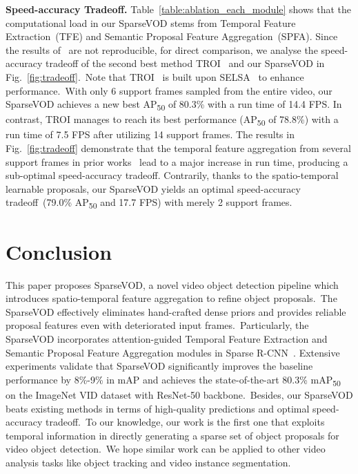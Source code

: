 \documentclass{bmvc2k}
\begin{document}
\noindent \textbf{Speed-accuracy Tradeoff.}
\label{subsec:comp_analysis}
Table~\ref{table:ablation_each_module} shows that the computational load in our SparseVOD stems from Temporal Feature Extraction~(TFE) and Semantic Proposal Feature Aggregation~(SPFA). Since the results of~\cite{he2021end} are not reproducible, for direct comparison, we analyse the speed-accuracy tradeoff of the second best method TROI~\cite{gong2021temporal} and our SparseVOD in Fig.~\ref{fig:tradeoff}.~Note that TROI~\cite{gong2021temporal} is built upon SELSA~\cite{wu2019sequence} to enhance performance.~With only 6 support frames sampled from the entire video, our SparseVOD achieves a new best AP\textsubscript{50} of 80.3\% with a run time of 14.4 FPS. In contrast, TROI manages to reach its best performance (AP\textsubscript{50} of 78.8\%) with a run time of 7.5 FPS after utilizing 14 support frames. The results in Fig.~\ref{fig:tradeoff} demonstrate that the temporal feature aggregation from several support frames in prior works~\cite{wu2019sequence, gong2021temporal} lead to a major increase in run time, producing a sub-optimal speed-accuracy tradeoff. Contrarily, thanks to the spatio-temporal learnable proposals, our SparseVOD yields an optimal speed-accuracy tradeoff~(79.0\% AP\textsubscript{50} and 17.7 FPS) with merely 2 support frames.



\vspace{-15pt}
\section{Conclusion}
\label{sec:conclusion}
\vspace{-5pt}
This paper proposes SparseVOD, a novel video object detection pipeline which introduces spatio-temporal feature aggregation to refine object proposals.~The SparseVOD effectively eliminates hand-crafted dense priors and provides reliable proposal features even with deteriorated input frames.~Particularly, the SparseVOD incorporates attention-guided Temporal Feature Extraction and Semantic Proposal Feature Aggregation modules in Sparse R-CNN~\cite{sun2021sparse}. Extensive experiments validate that SparseVOD significantly improves the baseline performance by 8\%-9\% in mAP and achieves the state-of-the-art 80.3\% mAP\textsubscript{50} on the ImageNet VID dataset with ResNet-50 backbone.~Besides, our SparseVOD beats existing methods in terms of high-quality predictions and optimal speed-accuracy tradeoff.~To our knowledge, our work is the first one that exploits temporal information in directly generating a sparse set of object proposals for video object detection.~We hope similar work can be applied to other video analysis tasks like object tracking and video instance segmentation.
















\end{document}
